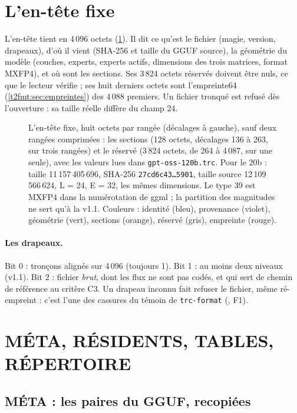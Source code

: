 \section{L'en-tête fixe}\label{t2fmt:sec:entete}

L'en-tête tient en 4\,096 octets (\cref{t2fmt:fig:entete}). Il dit ce qu'est le fichier (magie, version, drapeaux), d'où il vient (SHA-256 et taille du GGUF source), la géométrie du modèle (couches, experts, experts actifs, dimensions des trois matrices, format MXFP4), et où sont les sections. Ses 3\,824 octets réservés doivent être nuls, ce que le lecteur vérifie ; ses huit derniers octets sont l'empreinte64 (\cref{t2fmt:sec:empreintes}) des 4\,088 premiers. Un fichier tronqué est refusé dès l'ouverture : sa taille réelle diffère du champ 24.

\begin{figure}[p]
\centering
\TdFmtEntete
\caption[L'en-tête fixe, octet par octet]{L'en-tête fixe, huit octets par rangée (décalages à gauche), sauf deux rangées comprimées : les sections (128 octets, décalages 136 à 263, sur trois rangées) et le réservé (3\,824 octets, de 264 à 4\,087, sur une seule), avec les valeurs lues dans \texttt{gpt-oss-120b.trc}. Pour le 20b : taille 11\,157\,405\,696, SHA-256 \texttt{27cd6c43…5901}, taille source 12\,109\,566\,624, L = 24, E = 32, les mêmes dimensions. Le type 39 est MXFP4 dans la numérotation de ggml ; la partition des magnitudes ne sert qu'à la v1.1. Couleurs : identité (bleu), provenance (violet), géométrie (vert), sections (orange), réservé (gris), empreinte (rouge).}
\label{t2fmt:fig:entete}
\end{figure}

\paragraph{Les drapeaux.} Bit 0 : tronçons alignés sur 4\,096 (toujours 1). Bit 1 : au moins deux niveaux (v1.1). Bit 2 : fichier \emph{brut}, dont les flux ne sont pas codés, et qui sert de chemin de référence au critère C3. Un drapeau inconnu fait refuser le fichier, même ré-empreint : c'est l'une des cassures du témoin de \texttt{trc-format} (, F1).

\section{MÉTA, RÉSIDENTS, TABLES, RÉPERTOIRE}\label{t2fmt:sec:sections}

\subsection{MÉTA : les paires du GGUF, recopiées}

